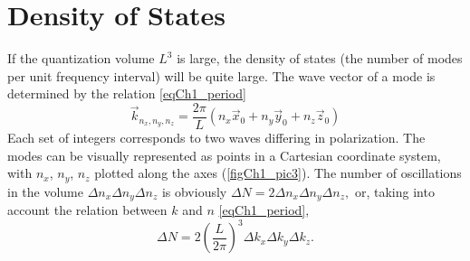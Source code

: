 \section{Density of States}
If the quantization volume $L^3$ is large, the density of states (the number of modes per unit frequency interval) will be quite large. The wave vector of a mode is determined by the relation
\eqref{eqCh1_period}
\begin{equation}
\vec{k}_{n_x, n_y, n_z} = \frac{2 \pi}{L}\left(n_x \vec{x}_0
+ n_y \vec{y}_0
+ n_z \vec{z}_0
\right)
\end{equation}
Each set of integers corresponds to two waves differing in polarization. The modes can be visually represented as points in a Cartesian coordinate system, with $n_x$, $n_y$, $n_z$ plotted along the axes (\autoref{figCh1_pic3}). The number of oscillations in the volume  
\(
\Delta n_x \Delta n_y \Delta n_z
\)
is obviously 
\(
\Delta N = 2 \Delta n_x \Delta n_y \Delta n_z,
\)
or, taking into account the relation  
between $k$ and $n$ \eqref{eqCh1_period},
\begin{equation}
\Delta N = 2 \left(\frac{L}{2 \pi} \right)^3 \Delta k_x \Delta k_y \Delta k_z.
\label{eqCh1_modenumber}
\end{equation}





